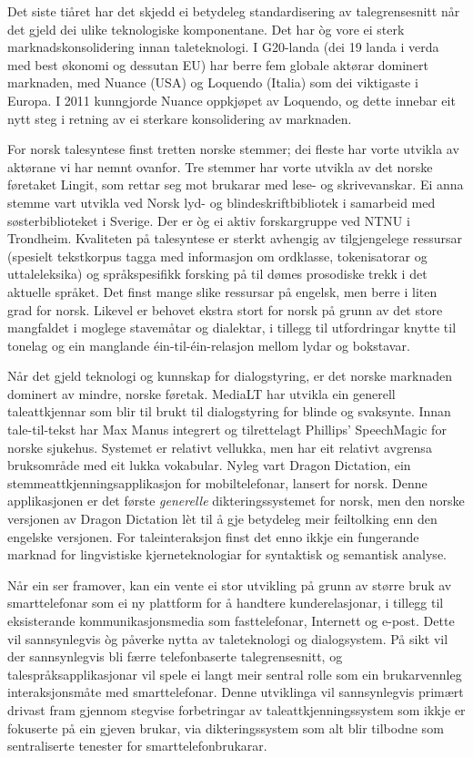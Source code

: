 \begin{multicols}{2}
Det siste tiåret har det skjedd ei betydeleg standardisering av talegrensesnitt når det gjeld dei ulike teknologiske komponentane. Det har òg vore ei sterk marknadskonsolidering innan taleteknologi. I G20-landa (dei 19 landa i verda med best økonomi og dessutan EU) har berre fem globale aktørar dominert marknaden, med Nuance (USA) og Loquendo (Italia) som dei viktigaste i Europa. I 2011 kunngjorde Nuance oppkjøpet av Loquendo, og dette innebar eit nytt steg i retning av ei sterkare konsolidering av marknaden. 

For norsk talesyntese finst tretten norske stemmer; dei fleste har vorte utvikla av aktørane vi har nemnt ovanfor. 
Tre stemmer har vorte utvikla av det norske føretaket Lingit, som rettar seg mot brukarar med lese- og skrivevanskar. 
Ei anna stemme vart utvikla ved Norsk lyd- og blindeskriftbibliotek i samarbeid med søsterbiblioteket i Sverige. 
Der er òg ei aktiv forskargruppe ved NTNU i Trondheim. 
Kvaliteten på talesyntese er sterkt avhengig av tilgjengelege ressursar (spesielt tekstkorpus tagga med informasjon om ordklasse, tokenisatorar og uttaleleksika) og språkspesifikk forsking på til dømes prosodiske trekk i det aktuelle språket. 
Det finst mange slike ressursar på engelsk, men berre i liten grad for norsk. Likevel er behovet ekstra stort for norsk på grunn av det store mangfaldet i moglege stavemåtar og dialektar, i tillegg til utfordringar knytte til tonelag og ein manglande éin-til-éin-relasjon mellom lydar og bokstavar. 

Når det gjeld teknologi og kunnskap for dialogstyring, er det norske marknaden dominert av mindre, norske føretak. 
MediaLT har utvikla ein generell taleattkjennar som blir til brukt til dialogstyring for blinde og svaksynte. 
Innan tale-til-tekst har Max Manus integrert og tilrettelagt Phillips’ SpeechMagic for norske sjukehus. 
Systemet er relativt vellukka, men har eit relativt avgrensa bruksområde med eit lukka vokabular. 
Nyleg vart Dragon Dictation, ein stemmeattkjenningsapplikasjon for mobiltelefonar, lansert for norsk. 
Denne applikasjonen er det første \textit{generelle} dikteringssystemet for norsk, men den norske versjonen av Dragon Dictation lèt til å gje betydeleg meir feiltolking enn den engelske versjonen. 
For taleinteraksjon finst det enno ikkje ein fungerande marknad for lingvistiske kjerneteknologiar for syntaktisk og semantisk analyse. 

Når ein ser framover, kan ein vente ei stor utvikling på grunn av større bruk av smarttelefonar som ei ny plattform for å handtere kunderelasjonar, i tillegg til eksisterande kommunikasjonsmedia som fasttelefonar, Internett og e-post. 
Dette vil sannsynlegvis òg påverke nytta av taleteknologi og dialogsystem. På sikt vil der sannsynlegvis bli færre telefonbaserte talegrensesnitt, og talespråksapplikasjonar vil spele ei langt meir sentral rolle som ein brukarvennleg interaksjonsmåte med smarttelefonar. 
Denne utviklinga vil sannsynlegvis primært drivast fram gjennom stegvise forbetringar av taleattkjenningssystem som ikkje er fokuserte på ein gjeven brukar, via dikteringssystem som alt blir tilbodne som sentraliserte tenester for smarttelefonbrukarar. 


\end{multicols}
